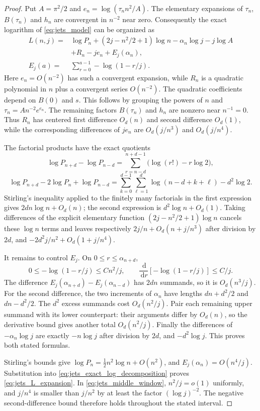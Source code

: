 \documentclass[11pt]{article}
\numberwithin{equation}{section}
\theoremstyle{definition}
\newcommand{\dd}{\,\mathrm d}
\begin{document}
\begin{proof}
Put $A=\pi^2/2$ and
$e_n=\log(\tau_n n^2/A)$.  The elementary expansions of $\tau_n$,
$B(\tau_n)$ and $h_n$ are convergent in $n^{-2}$ near zero.
Consequently the exact logarithm of \eqref{eq:jets_model} can be
organized as
\begin{equation}\label{eq:jets_exact_log_decomposition}
 \begin{split}
 L(n,j)={}&\log P_n+(2j-n^2/2+1)\log n
       -\alpha_n\log j-j\log A\\
       &+R_n-je_n+E_j(\alpha_n),\\
 E_j(a)={}&\sum_{r=0}^{a-1}-\log(1-r/j).
 \end{split}
\end{equation}
Here $e_n=O(n^{-2})$ has such a convergent expansion, while
$R_n$ is a quadratic polynomial in $n$ plus a convergent series
$O(n^{-2})$. The quadratic coefficients depend on $B(0)$ and $s$.
This follows by grouping the powers of $n$ and $\tau_n=A n^{-2}e^{e_n}$.
The remaining factors $B(\tau_n)$ and $h_n$ are nonzero near
$n^{-1}=0$.  Thus $R_n$ has centered first difference $O_d(n)$
and second difference $O_d(1)$, while the corresponding differences
of $je_n$ are $O_d(j/n^3)$ and $O_d(j/n^4)$.

The factorial products have the exact quotients
\[
 \log P_{n+d}-\log P_{n-d}
   =\sum_{r=n-d}^{n+d-1}\bigl(\log(r!)-r\log2\bigr),
\]
\[
 \log P_{n+d}-2\log P_n+\log P_{n-d}
   =\sum_{k=0}^{d-1}\sum_{\ell=1}^{d}
        \log(n-d+k+\ell)-d^2\log2.
\]
Stirling's inequality applied to the finitely many factorials in the
first expression gives $2dn\log n+O_d(n)$; the second expression
is $d^2\log n+O_d(1)$.  Taking differences of the explicit elementary
function $(2j-n^2/2+1)\log n$ cancels these $\log n$ terms and leaves
respectively $2j/n+O_d(n+j/n^3)$ after division by $2d$, and
$-2d^2j/n^2+O_d(1+j/n^4)$.

It remains to control $E_j$.  On $0\le r\le\alpha_{n+d}$,
\[
 0\le-\log(1-r/j)\le Cn^2/j,\qquad
 \frac{\dd}{\dd r}[-\log(1-r/j)]\le C/j.
\]
The difference $E_j(\alpha_{n+d})-E_j(\alpha_{n-d})$ has
$2dn$ summands, so it is $O_d(n^3/j)$.  For the second difference,
the two increments of $\alpha_n$ have lengths
$dn+d^2/2$ and $dn-d^2/2$.  The $d^2$ excess summands cost
$O_d(n^2/j)$.  Pair each remaining upper summand with its lower
counterpart: their arguments differ by $O_d(n)$, so the derivative
bound gives another total $O_d(n^2/j)$.  Finally the differences of
$-\alpha_n\log j$ are exactly $-n\log j$ after division by $2d$,
and $-d^2\log j$.  This proves both stated formulas.

Stirling's bounds give
$\log P_n=\tfrac12n^2\log n+O(n^2)$, and
$E_j(\alpha_n)=O(n^4/j)$.  Substitution into
\eqref{eq:jets_exact_log_decomposition} proves
\eqref{eq:jets_L_expansion}.  In \eqref{eq:jets_middle_window},
$n^2/j=o(1)$ uniformly, and $j/n^4$ is smaller than $j/n^2$ by
at least the factor $(\log j)^{-2}$.  The negative second-difference
bound therefore holds throughout the stated interval.
\end{proof}
\end{document}
